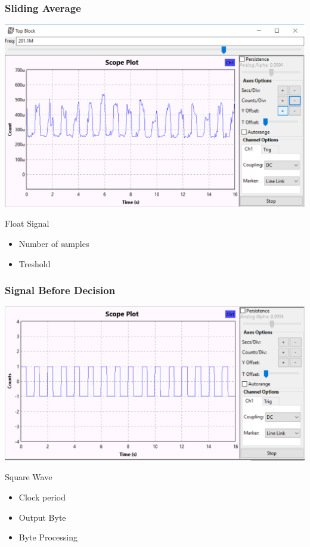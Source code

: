 \begin{frame}
	\frametitle{Sliding Average}
	\centering \includegraphics[scale=.35]{images/apres_average.png}
	\begin{block}{Float Signal}
		\begin{itemize}
			\item Number of samples
			\item Treshold
		\end{itemize}
	\end{block}
\end{frame}

\begin{frame}
	\frametitle{Signal Before Decision}
	\centering \includegraphics[scale=.35]{images/apres_add_const.png}
	\begin{block}{Square Wave}
		\begin{itemize}
			\item Clock period
			\item Output Byte
			\item Byte Processing
		\end{itemize}
	\end{block}
\end{frame}

